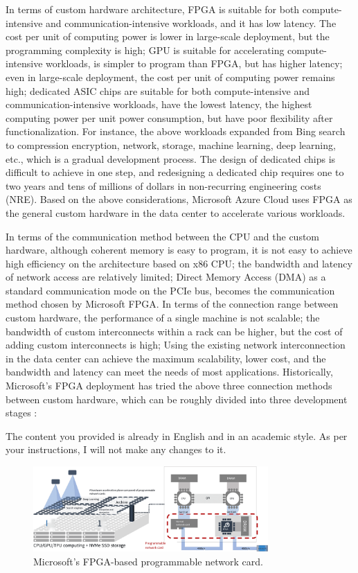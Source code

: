 In terms of custom hardware architecture, FPGA is suitable for both compute-intensive and communication-intensive workloads, and it has low latency. The cost per unit of computing power is lower in large-scale deployment, but the programming complexity is high; GPU is suitable for accelerating compute-intensive workloads, is simpler to program than FPGA, but has higher latency; even in large-scale deployment, the cost per unit of computing power remains high; dedicated ASIC chips are suitable for both compute-intensive and communication-intensive workloads, have the lowest latency, the highest computing power per unit power consumption, but have poor flexibility after functionalization. For instance, the above workloads expanded from Bing search to compression encryption, network, storage, machine learning, deep learning, etc., which is a gradual development process. The design of dedicated chips is difficult to achieve in one step, and redesigning a dedicated chip requires one to two years and tens of millions of dollars in non-recurring engineering costs (NRE).
Based on the above considerations, Microsoft Azure Cloud uses FPGA as the general custom hardware in the data center to accelerate various workloads.

In terms of the communication method between the CPU and the custom hardware, although coherent memory is easy to program, it is not easy to achieve high efficiency on the architecture based on x86 CPU; the bandwidth and latency of network access are relatively limited; Direct Memory Access (DMA) as a standard communication mode on the PCIe bus, becomes the communication method chosen by Microsoft FPGA.
In terms of the connection range between custom hardware, the performance of a single machine is not scalable; the bandwidth of custom interconnects within a rack can be higher, but the cost of adding custom interconnects is high;
Using the existing network interconnection in the data center can achieve the maximum scalability, lower cost, and the bandwidth and latency can meet the needs of most applications.
Historically, Microsoft's FPGA deployment has tried the above three connection methods between custom hardware, which can be roughly divided into three development stages \cite{configurable-cloud-acceleration}:

The content you provided is already in English and in an academic style. As per your instructions, I will not make any changes to it.

\begin{figure}[htbp]
	\centering
	\includegraphics[width=0.8\textwidth]{figures/azure_fpga.pdf}
	\caption{Microsoft's FPGA-based programmable network card.}
	\label{background:fig:azure_fpga}
\end{figure}

